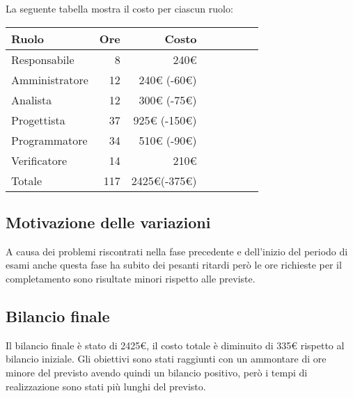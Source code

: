 La seguente tabella mostra il costo per ciascun ruolo:
\begin{table}[ht]
    \begin{tabularx}{\linewidth}{X|rrrrrrr}
    \rowcolor{gray!30}Ruolo & Ore & Costo \\
    \hline
    Responsabile                            & 8   & 240€ \\
    \rowcolor{gray!10}Amministratore        & 12  & 240€ (-60€) \\
    Analista                                & 12  & 300€ (-75€) \\
    \rowcolor{gray!10}Progettista           & 37  & 925€ (-150€)\\
    Programmatore                           & 34  & 510€ (-90€)\\
    \rowcolor{gray!10}Verificatore          & 14  & 210€  \\
    \hline Totale                           & 117 & 2425€(-375€)\\ 
    \end{tabularx}
\end{table}

\subsection{Motivazione delle variazioni}

A causa dei problemi riscontrati nella fase precedente e dell'inizio del periodo di esami anche questa fase ha subito dei pesanti ritardi però le ore richieste per il completamento sono risultate minori rispetto alle previste.

\subsection{Bilancio finale}

Il bilancio finale è stato di 2425€, il costo totale è diminuito di 335€ rispetto al bilancio iniziale. Gli obiettivi sono stati raggiunti con un ammontare di ore minore del previsto avendo quindi un bilancio positivo, però i tempi di realizzazione sono stati più lunghi del previsto.
